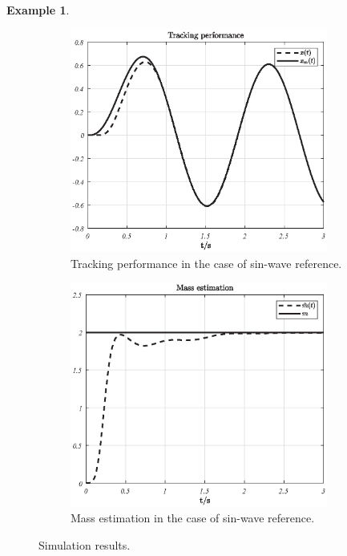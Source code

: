 \documentclass[11pt,a4paper,oneside]{book}
\numberwithin{equation}{section}
\theoremstyle{it}
\theoremstyle{definition}
\newtheorem{example}{Example}[chapter]
\begin{document}
\begin{example}
	\begin{figure}[H]
		\centering
		\begin{subfigure}{.5\textwidth}
			\centering
			\includegraphics[width = 240pt, keepaspectratio]{figures/adaptive_control/sin_track.eps}
			\captionsetup{width=0.5\textwidth, font=small}		
			\caption{Tracking performance in the case of sin-wave reference.}
			\label{figSim1}
		\end{subfigure}%
		\begin{subfigure}{.5\textwidth}
			\centering
			\includegraphics[width = 240pt, keepaspectratio]{figures/adaptive_control/sin_mass_est.eps}
			\captionsetup{width=0.5\textwidth, font=small}		
			\caption{Mass estimation in the case of sin-wave reference.}
			\label{figSim2}
		\end{subfigure}
		\caption{Simulation results.}
		\label{}
	\end{figure}
	

\end{example}
\end{document}
